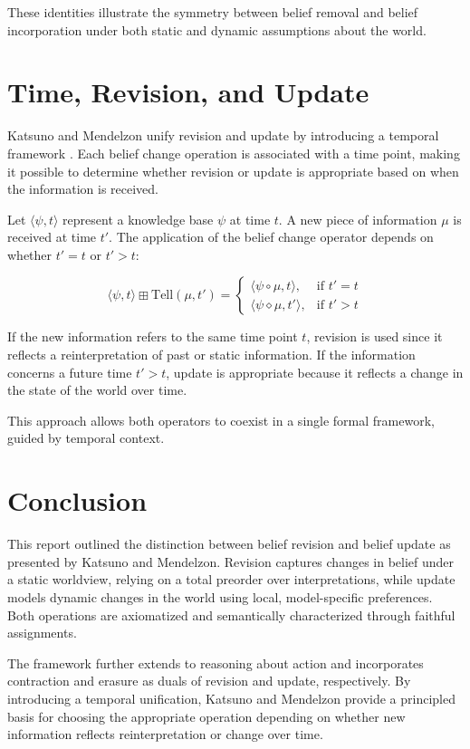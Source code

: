 \documentclass[runningheads]{llncs}
\begin{document}
These identities illustrate the symmetry between belief removal and belief incorporation under both static and dynamic assumptions about the world.

\section{Time, Revision, and Update}

Katsuno and Mendelzon unify revision and update by introducing a temporal framework \cite{katsuno}. Each belief change operation is associated with a time point, making it possible to determine whether revision or update is appropriate based on when the information is received.

Let \( \langle \psi, t \rangle \) represent a knowledge base \( \psi \) at time \( t \). A new piece of information \( \mu \) is received at time \( t' \). The application of the belief change operator depends on whether \( t' = t \) or \( t' > t \):

\[
\langle \psi, t \rangle \boxplus \text{Tell}(\mu, t') =
\begin{cases}
\langle \psi \circ \mu, t \rangle, & \text{if } t' = t \\
\langle \psi \diamond \mu, t' \rangle, & \text{if } t' > t
\end{cases}
\]

If the new information refers to the same time point \( t \), revision is used since it reflects a reinterpretation of past or static information. If the information concerns a future time \( t' > t \), update is appropriate because it reflects a change in the state of the world over time.

This approach allows both operators to coexist in a single formal framework, guided by temporal context.

\section{Conclusion}

This report outlined the distinction between belief revision and belief update as presented by Katsuno and Mendelzon. Revision captures changes in belief under a static worldview, relying on a total preorder over interpretations, while update models dynamic changes in the world using local, model-specific preferences. Both operations are axiomatized and semantically characterized through faithful assignments.

The framework further extends to reasoning about action and incorporates contraction and erasure as duals of revision and update, respectively. By introducing a temporal unification, Katsuno and Mendelzon provide a principled basis for choosing the appropriate operation depending on whether new information reflects reinterpretation or change over time.
\end{document}
